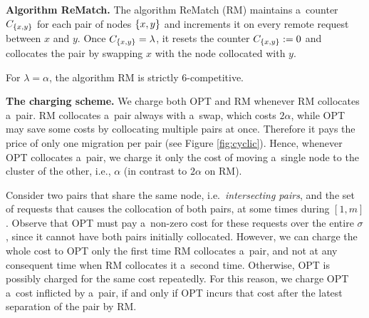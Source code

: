 \documentclass[a4paper,anonymous,USenglish]{lipics-v2019}
\newcommand{\OPT}{\textsc{OPT}\xspace}
\newcommand{\RM}{\textsc{RM}\xspace} %
\DeclarePairedDelimiter\set{\{}{\}}
\begin{document}
\noindent
\textbf{Algorithm ReMatch.} 
The algorithm ReMatch (\RM) maintains a~counter $C_{\set{x,y}}$ for each pair of nodes $\set{x,y}$ and increments it on every remote request between $x$ and $y$.
Once $C_{\set{x,y}} = \lambda$,
it resets the counter $C_{\set{x,y}}:=0$ and collocates the pair by swapping $x$ with the node collocated with $y$.


\begin{theorem} \label{thm:k=2}
	For $\lambda=\alpha$, the algorithm \RM  is strictly 6-competitive.
\end{theorem}

\noindent
\textbf{The charging scheme.}
We charge both \OPT and \RM whenever \RM collocates a~pair.%
\RM collocates a~pair always with a~swap,%
which  costs $2\alpha$,
while \OPT may save some costs by collocating multiple pairs at once.
 Therefore it pays the price of only one migration per pair  (see Figure \ref{fig:cyclic}).
Hence,
whenever \OPT collocates a~pair,
we charge it only the cost of moving a~single node to the cluster of the other,
i.e., $\alpha$ (in contrast to $2\alpha$ on \RM).

Consider two  pairs that share the same node, 
i.e.~\emph{intersecting pairs},
and the set of requests that causes the collocation of both pairs,
at some  times during  $[1,m]$.
Observe that \OPT must pay a~non-zero cost
for these requests over the entire $\sigma$,
since it cannot have both pairs initially collocated.
However,
we can charge the whole cost to \OPT only the first time \RM collocates a~pair,
and not at any consequent time when \RM collocates it a~second time.
Otherwise,
 \OPT is possibly charged for the same cost repeatedly.
For this reason,
we charge \OPT a~cost inflicted by a~pair,
if and only if  \OPT incurs that cost after the latest separation of the pair by \RM.
\end{document}
